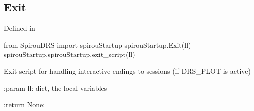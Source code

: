 
\noindent\begin{minipage}{\textwidth}
\subsection{Exit}

Defined in \spirouStartup{}

\begin{pythonbox}
from SpirouDRS import spirouStartup
spirouStartup.Exit(ll)
spirouStartup.spirouStartup.exit_script(ll)
\end{pythonbox}

\begin{pythondocstring}
Exit script for handling interactive endings to sessions (if DRS_PLOT is
active)

:param ll: dict, the local variables

:return None:
\end{pythondocstring}
\end{minipage}